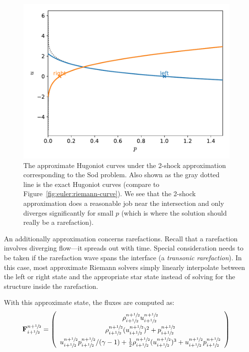\begin{figure}[t]
\centering
\includegraphics[width=0.9\linewidth]{riemann-2shock-sod-phase}
\caption[The approximate (2-shock) Hugoniot curves corresponding to
  the Sod problem]{\label{fig:euler:riemann-2shock-curve} The
  approximate Hugoniot curves under the 2-shock approximation
  corresponding to the Sod problem.  Also shown as the gray dotted
  line is the exact Hugoniot curves (compare to
  Figure~\ref{fig:euler:riemann-curve}).  We see that the 2-shock
  approximation does a reasonable job near the intersection and only
  diverges significantly for small $p$ (which is where the solution
  should really be a
  rarefaction).\\ 
  }
\end{figure}

An additionally approximation concerns rarefactions.  Recall that a
rarefaction involves diverging flow---it spreads out with time.
Special consideration needs to be taken if the rarefaction wave spans
the interface (a {\em transonic rarefaction}).  In this case, most
approximate Riemann solvers simply linearly interpolate between the
left or right state and the appropriate star state instead of solving
for the structure inside the rarefaction.

With this approximate state, the fluxes are computed as:
\begin{equation}
\renewcommand{\arraystretch}{1.5}
\Fb_{i+\myhalf}^{n+\myhalf} = \left ( \begin{array}{c}
                             \rho_{i+\myhalf}^{n+\myhalf} u_{i+\myhalf}^{n+\myhalf} \\
                             \rho_{i+\myhalf}^{n+\myhalf} (u_{i+\myhalf}^{n+\myhalf})^2 + p_{i+\myhalf}^{n+\myhalf} \\
                             u_{i+\myhalf}^{n+\myhalf} p_{i+\myhalf}^{n+\myhalf} / (\gamma - 1)  +
                             \frac{1}{2} \rho_{i+\myhalf}^{n+\myhalf} (u_{i+\myhalf}^{n+\myhalf})^3 +
                             u_{i+\myhalf}^{n+\myhalf} p_{i+\myhalf}^{n+\myhalf}
                            \end{array} \right )
\renewcommand{\arraystretch}{1.0}
\end{equation}

